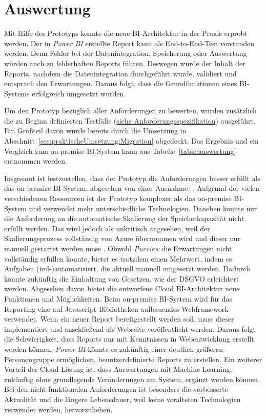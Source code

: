\section{Auswertung} \label{sec:umsetzung:auswertung}
Mit Hilfe des Prototyps konnte die neue BI-Architektur in der Praxis erprobt werden. Der in \textit{Power BI} erstellte Report kann als End-to-End-Test verstanden werden. Denn Fehler bei der Datenintegration, Speicherung oder Auswertung würden auch zu fehlerhaften Reports führen. Deswegen wurde der Inhalt der Reports, nachdem die Datenintegration durchgeführt wurde, validiert und entsprach den Erwartungen. Daraus folgt, dass die Grundfunktionen eines BI-Systems erfolgreich umgesetzt wurden.

Um den Prototyp bezüglich aller Anforderungen zu bewerten, wurden zusätzlich die zu Beginn definierten Testfälle (\hyperref[sec:anforderungsspezifikation:funktionaleAnforderungen]{siehe Anforderungsspezifikation}) ausgeführt. Ein Großteil davon wurde bereits durch die Umsetzung in Abschnitt~\ref{sec:praktischeUmsetzung:Migration} abgedeckt. Das Ergebnis und ein Vergleich zum on-premise BI-System kann aus Tabelle~\ref{table:auswertung} entnommen werden. 



Insgesamt ist festzustellen, dass der Prototyp die Anforderungen besser erfüllt als das on-premise BI-System, abgesehen von einer Ausnahme: \textit{}. Aufgrund der vielen verschiedenen Ressourcen ist der Prototyp komplexer als das on-premise BI-System und verwendet mehr unterschiedliche Technologien. Daneben konnte nur die Anforderung an die automatische Skalierung der Speicherkapazität nicht erfüllt werden. Das wird jedoch als unkritisch angesehen, weil der Skalierungsprozess vollständig von Azure übernommen wird und dieser nur manuell gestartet werden muss \cite{reagan_web_2018}. Obwohl \textit{Purview} die Erwartungen nicht vollständig erfüllen konnte, bietet es trotzdem einen Mehrwert, indem es Aufgaben (teil-)automatisiert, die aktuell manuell umgesetzt werden. Dadurch könnte zukünftig die Einhaltung von Gesetzen, wie der DSGVO erleichtert werden. Abgesehen davon bietet die entworfene Cloud BI-Architektur neue Funktionen und Möglichkeiten. Beim on-premise BI-System wird für das Reporting eine auf Javascript-Bibliotheken aufbauendes Webframework verwendet. Wenn ein neuer Report bereitgestellt werden soll, muss dieser implementiert und anschließend als Webseite veröffentlicht werden. Daraus folgt die Schwierigkeit, dass Reports nur mit Kenntnissen in Webentwicklung erstellt werden können. \textit{Power BI} könnte es zukünftig einer deutlich größeren Personengruppe ermöglichen, benutzerdefinierte Reports zu erstellen. Ein weiterer Vorteil der Cloud Lösung ist, dass Auswertungen mit Machine Learning, zukünftig ohne grundlegende Veränderungen am System, ergänzt werden können. Bei den nicht-funktionalen Anforderungen ist besonders die verbesserte Aktualität und die längere Lebensdauer, weil keine veralteten Technologien verwendet werden, hervorzuheben.